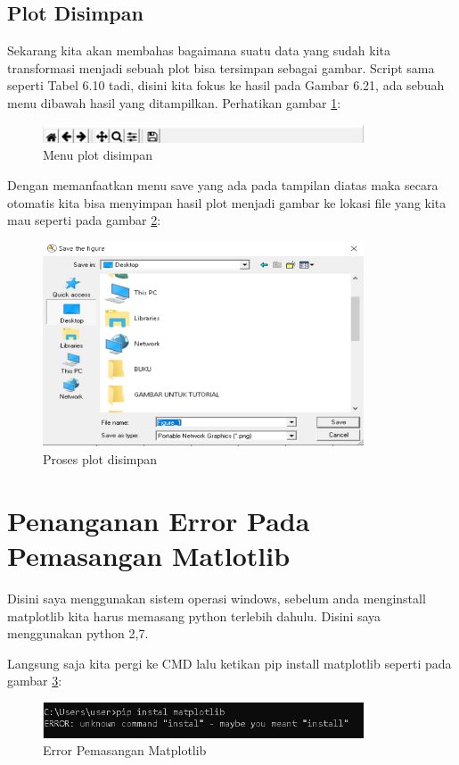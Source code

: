 \subsection{Plot Disimpan}
Sekarang kita akan membahas bagaimana suatu data yang sudah kita transformasi menjadi sebuah plot bisa tersimpan sebagai gambar. 
Script sama seperti Tabel 6.10 tadi, disini kita fokus ke hasil pada Gambar 6.21, ada sebuah menu dibawah hasil yang ditampilkan. 
Perhatikan gambar  \ref{fig:menuplot}:
\begin{figure}[!htbp]
	\centerline{\includegraphics[width=0.85\textwidth]{figures/6/menuplot.PNG}}
	\caption{Menu plot disimpan}
	\label{fig:menuplot}
\end{figure} 

Dengan memanfaatkan menu save yang ada pada tampilan diatas maka secara otomatis kita bisa menyimpan hasil plot menjadi gambar ke lokasi file yang kita mau seperti pada gambar \ref{fig:prosesplot}:
\begin{figure}[!htbp]
	\centerline{\includegraphics[width=0.85\textwidth]{figures/6/prosesplot.PNG}}
	\caption{Proses plot disimpan}
	\label{fig:prosesplot}
\end{figure} 

\section{Penanganan Error Pada Pemasangan Matlotlib}
Disini saya menggunakan sistem operasi windows, sebelum anda menginstall matplotlib kita harus memasang python terlebih dahulu. Disini saya menggunakan python 2,7.

Langsung saja kita pergi ke CMD lalu ketikan pip install matplotlib seperti pada gambar \ref{fig:errormat}:
\begin{figure}[!htbp]
	\centerline{\includegraphics[width=0.85\textwidth]{figures/6/errormat.PNG}}
	\caption{Error Pemasangan Matplotlib}
	\label{fig:errormat}
\end{figure} 

